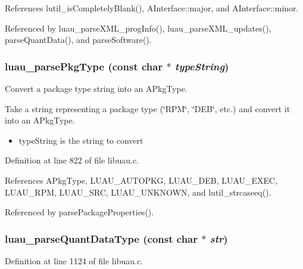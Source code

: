 References lutil\_\-is\-Completely\-Blank(), AInterface::major, and AInterface::minor.

Referenced by luau\_\-parse\-XML\_\-prog\-Info(), luau\_\-parse\-XML\_\-updates(), parse\-Quant\-Data(), and parse\-Software().
\subsubsection{ luau\_\-parse\-Pkg\-Type (const char $\ast$ {\em type\-String})}\label{libuau_8c_a25}


Convert a package type string into an APkg\-Type. 

Take a string representing a package type (\char`\"{}RPM\char`\"{}, \char`\"{}DEB\char`\"{}, etc.) and convert it into an APkg\-Type.

\begin{itemize}
\item type\-String is the string to convert 
\end{itemize}


Definition at line 822 of file libuau.c.

References APkg\-Type, LUAU\_\-AUTOPKG, LUAU\_\-DEB, LUAU\_\-EXEC, LUAU\_\-RPM, LUAU\_\-SRC, LUAU\_\-UNKNOWN, and lutil\_\-strcaseeq().

Referenced by parse\-Package\-Properties().
\subsubsection{ luau\_\-parse\-Quant\-Data\-Type (const char $\ast$ {\em str})}\label{libuau_8c_a40}




Definition at line 1124 of file libuau.c.

